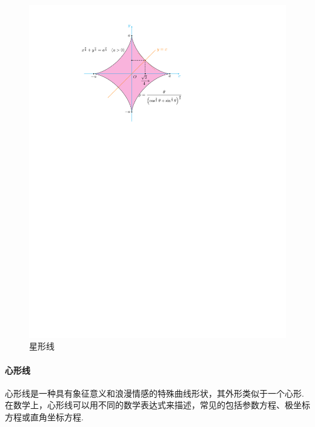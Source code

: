 \begin{figure}[H]
    \centering
    \includegraphics{figures/StarLine.pdf}
    \caption{星形线}
    \label{starLine}
\end{figure}

\paragraph{心形线}

心形线是一种具有象征意义和浪漫情感的特殊曲线形状，其外形类似于一个心形. 在数学上，心形线可以用不同的数学表达式来描述，常见的包括参数方程、极坐标方程或直角坐标方程. 

